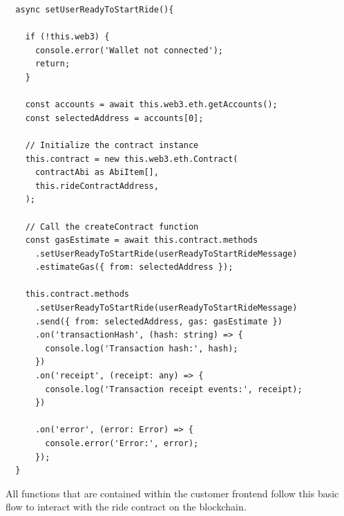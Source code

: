 

\begin{lstlisting}
  async setUserReadyToStartRide(){

    if (!this.web3) {
      console.error('Wallet not connected');
      return;
    }

    const accounts = await this.web3.eth.getAccounts();
    const selectedAddress = accounts[0];

    // Initialize the contract instance
    this.contract = new this.web3.eth.Contract(
      contractAbi as AbiItem[],
      this.rideContractAddress,
    );

    // Call the createContract function
    const gasEstimate = await this.contract.methods
      .setUserReadyToStartRide(userReadyToStartRideMessage)
      .estimateGas({ from: selectedAddress });

    this.contract.methods
      .setUserReadyToStartRide(userReadyToStartRideMessage)
      .send({ from: selectedAddress, gas: gasEstimate })
      .on('transactionHash', (hash: string) => {
        console.log('Transaction hash:', hash);
      })
      .on('receipt', (receipt: any) => {
        console.log('Transaction receipt events:', receipt);
      })

      .on('error', (error: Error) => {
        console.error('Error:', error);
      });
  }
\end{lstlisting}

All functions that are contained within the customer frontend follow this basic flow to interact with the ride contract on the blockchain.


